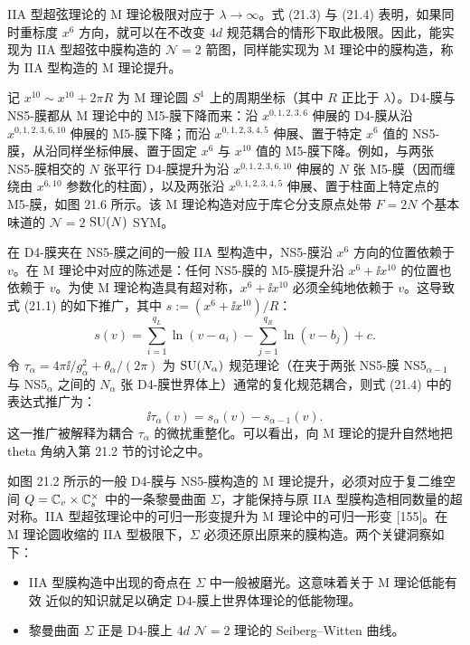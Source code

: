IIA 型超弦理论的 M 理论极限对应于 $\lambda\to\infty$。式 (21.3) 与 (21.4) 表明，如果同时重标度 $x^6$ 方向，就可以在不改变 $4d$ 规范耦合的情形下取此极限。因此，能实现为 IIA 型超弦中膜构造的 $\mathcal{N}=2$ 箭图，同样能实现为 M 理论中的膜构造，称为 IIA 型构造的 M 理论提升。

记 $x^{10}\sim x^{10}+2\pi R$ 为 M 理论圆 $S^1$ 上的周期坐标（其中 $R$ 正比于 $\lambda$）。D4-膜与 NS5-膜都从 M 理论中的 M5-膜下降而来：沿 $x^{0,1,2,3,6}$ 伸展的 D4-膜从沿 $x^{0,1,2,3,6,10}$ 伸展的 M5-膜下降；而沿 $x^{0,1,2,3,4,5}$ 伸展、置于特定 $x^6$ 值的 NS5-膜，从沿同样坐标伸展、置于固定 $x^6$ 与 $x^{10}$ 值的 M5-膜下降。例如，与两张 NS5-膜相交的 $N$ 张平行 D4-膜提升为沿 $x^{0,1,2,3,6,10}$ 伸展的 $N$ 张 M5-膜（因而缠绕由 $x^{6,10}$ 参数化的柱面），以及两张沿 $x^{0,1,2,3,4,5}$ 伸展、置于柱面上特定点的 M5-膜，如图 21.6 所示。该 M 理论构造对应于库仑分支原点处带 $F=2N$ 个基本味道的 $\mathcal{N}=2$ $\operatorname{SU}(N)$ SYM。


在 D4-膜夹在 NS5-膜之间的一般 IIA 型构造中，NS5-膜沿 $x^6$ 方向的位置依赖于 $v$。在 M 理论中对应的陈述是：任何 NS5-膜的 M5-膜提升沿 $x^6+\ii x^{10}$ 的位置也依赖于 $v$。为使 M 理论构造具有超对称，$x^6+\ii x^{10}$ 必须全纯地依赖于 $v$。这导致式 (21.1) 的如下推广，其中 $s:=(x^6+\ii x^{10})/R$：
\begin{equation}
s(v)=\sum_{i=1}^{q_L}\ln(v-a_i)-\sum_{j=1}^{q_R}\ln(v-b_j)+c.
\tag{21.5}
\end{equation}
令 $\tau_\alpha=4\pi\ii/g_\alpha^2+\theta_\alpha/(2\pi)$ 为 $\operatorname{SU}(N_\alpha)$ 规范理论（在夹于两张 NS5-膜 NS5$_{\alpha-1}$ 与 NS5$_\alpha$ 之间的 $N_\alpha$ 张 D4-膜世界体上）通常的复化规范耦合，则式 (21.4) 中的表达式推广为：
\[
\ii\tau_\alpha(v)=s_\alpha(v)-s_{\alpha-1}(v).
\]
这一推广被解释为耦合 $\tau_\alpha$ 的微扰重整化。可以看出，向 M 理论的提升自然地把 theta 角纳入第 21.2 节的讨论之中。

如图 21.2 所示的一般 D4-膜与 NS5-膜构造的 M 理论提升，必须对应于复二维空间 $Q=\mathbb{C}_v\times\mathbb{C}^\times_s$ 中的一条黎曼曲面 $\Sigma$，才能保持与原 IIA 型膜构造相同数量的超对称。IIA 型超弦理论中的可归一形变提升为 M 理论中的可归一形变 [155]。在 M 理论圆收缩的 IIA 型极限下，$\Sigma$ 必须还原出原来的膜构造。两个关键洞察如下：
\begin{itemize}
  \item IIA 型膜构造中出现的奇点在 $\Sigma$ 中一般被磨光。这意味着关于 M 理论低能有效
近似的知识就足以确定 D4-膜上世界体理论的低能物理。
  \item 黎曼曲面 $\Sigma$ 正是 D4-膜上 $4d$ $\mathcal{N}=2$ 理论的 Seiberg–Witten 曲线。
\end{itemize}

